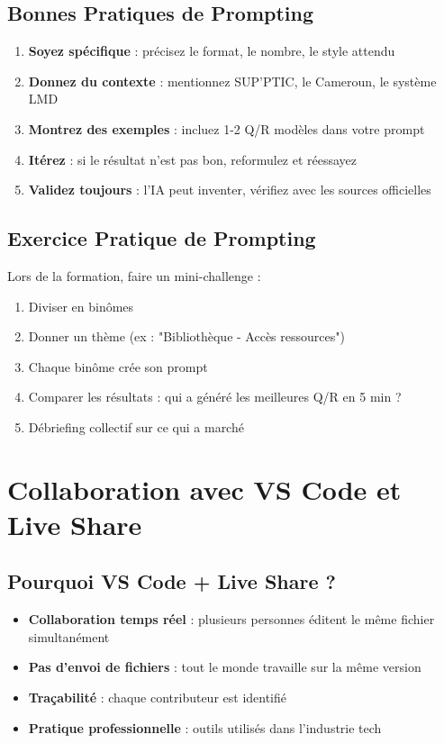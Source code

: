 \documentclass[11pt,a4paper]{article}
\begin{document}
\subsection{Bonnes Pratiques de Prompting}
\begin{important}
\begin{enumerate}
    \item \textbf{Soyez spécifique} : précisez le format, le nombre, le style attendu
    \item \textbf{Donnez du contexte} : mentionnez SUP'PTIC, le Cameroun, le système LMD
    \item \textbf{Montrez des exemples} : incluez 1-2 Q/R modèles dans votre prompt
    \item \textbf{Itérez} : si le résultat n'est pas bon, reformulez et réessayez
    \item \textbf{Validez toujours} : l'IA peut inventer, vérifiez avec les sources officielles
\end{enumerate}
\end{important}

\subsection{Exercice Pratique de Prompting}
Lors de la formation, faire un mini-challenge :
\begin{enumerate}
    \item Diviser en binômes
    \item Donner un thème (ex : "Bibliothèque - Accès ressources")
    \item Chaque binôme crée son prompt
    \item Comparer les résultats : qui a généré les meilleures Q/R en 5 min ?
    \item Débriefing collectif sur ce qui a marché
\end{enumerate}

\newpage
\section{Collaboration avec VS Code et Live Share}
\label{sec:vscode-liveshare}

\subsection{Pourquoi VS Code + Live Share ?}
\begin{itemize}
    \item \textbf{Collaboration temps réel} : plusieurs personnes éditent le même fichier simultanément
    \item \textbf{Pas d'envoi de fichiers} : tout le monde travaille sur la même version
    \item \textbf{Traçabilité} : chaque contributeur est identifié
    \item \textbf{Pratique professionnelle} : outils utilisés dans l'industrie tech
\end{itemize}
\end{document}
